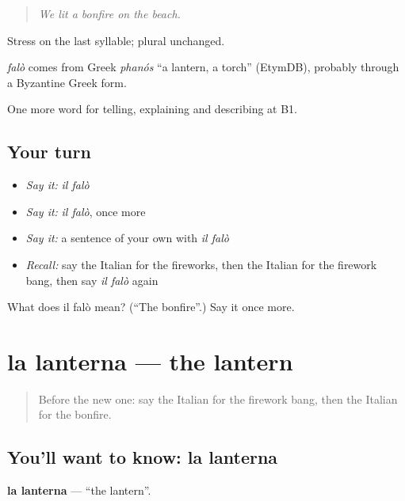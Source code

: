 \begin{quote}
\emph{We lit a bonfire on the beach.}
\end{quote}

Stress on the last syllable; plural unchanged.

\begin{cousinweb}
\emph{falò} comes from Greek \emph{phanós} \textquotedblleft{}a lantern, a torch\textquotedblright{} (EtymDB), probably through a Byzantine Greek form.
\end{cousinweb}

\begin{grammarlens}[title={What you've built}]
One more word for telling, explaining and describing at B1.
\end{grammarlens}

\subsection*{Your turn}
\begin{itemize}
\raggedright
  \item \emph{Say it:} \emph{il falò}
  \item \emph{Say it:} \emph{il falò}, once more
  \item \emph{Say it:} a sentence of your own with \emph{il falò}
  \item \emph{Recall:} say the Italian for the fireworks, then the Italian for the firework bang, then say \emph{il falò} again
\end{itemize}

\begin{tcolorbox}[breakable,colback=teal!4,colframe=teal!35!black,title={Before you move on}]
What does il falò mean? (\textquotedblleft{}The bonfire\textquotedblright{}.) Say it once more.
\end{tcolorbox}
\section[la lanterna]{la lanterna — the lantern}

\label{lesson:IT-C322-lanterna}



\begin{quote}
Before the new one: say the Italian for the firework bang, then the Italian for the bonfire.
\end{quote}

\subsection*{You'll want to know: la lanterna}
\textbf{la lanterna} — \textquotedblleft{}the lantern\textquotedblright{}.


